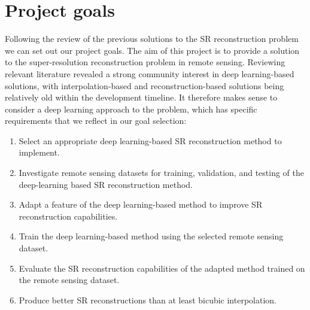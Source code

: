 \section{Project goals}
Following the review of the previous solutions to the SR reconstruction problem we can set out our project goals. The aim of this project is to provide a solution to the super-resolution reconstruction problem in remote sensing. Reviewing relevant literature revealed a strong community interest in deep learning-based solutions, with interpolation-based and reconstruction-based solutions being relatively old within the development timeline. It therefore makes sense to consider a deep learning approach to the problem, which has specific requirements that we reflect in our goal selection:
\begin{enumerate}
    \item Select an appropriate deep learning-based SR reconstruction method to implement.
    \item Investigate remote sensing datasets for training, validation, and testing of the deep-learning based SR reconstruction method.
    \item Adapt a feature of the deep learning-based method to improve SR reconstruction capabilities.
    \item Train the deep learning-based method using the selected remote sensing dataset.
    \item Evaluate the SR reconstruction capabilities of the adapted method trained on the remote sensing dataset.
    \item Produce better SR reconstructions than at least bicubic interpolation.
\end{enumerate}